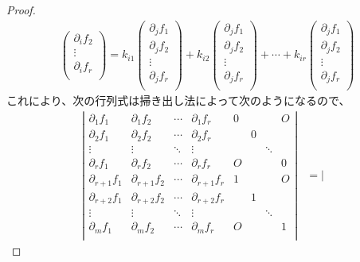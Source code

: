 \documentclass[dvipdfmx]{jsarticle}
\begin{document}
\begin{proof}
\begin{align*}
\begin{pmatrix}
  \partial_{i}f_{2} \\
   \vdots \\
  \partial_{i}f_{r} \\
\end{pmatrix} = k_{i1} \begin{pmatrix}
  \partial_{j}f_{1} \\
  \partial_{j}f_{2} \\
   \vdots \\
  \partial_{j}f_{r} \\
\end{pmatrix} + k_{i2} \begin{pmatrix}
  \partial_{j}f_{1} \\
  \partial_{j}f_{2} \\
   \vdots \\
  \partial_{j}f_{r} \\
\end{pmatrix} + \cdots + k_{ir} \begin{pmatrix}
  \partial_{j}f_{1} \\
  \partial_{j}f_{2} \\
   \vdots \\
  \partial_{j}f_{r} \\
\end{pmatrix}
\end{align*}
これにより、次の行列式は掃き出し法によって次のようになるので、
\begin{align*}
\left| \begin{matrix}
\partial_{1}f_{1} & \partial_{1}f_{2} & \cdots & \partial_{1}f_{r} & 0 & \  & \  & O \\
\partial_{2}f_{1} & \partial_{2}f_{2} & \cdots & \partial_{2}f_{r} & \  & 0 & \  & \  \\
 \vdots & \vdots & \ddots & \vdots & \  & \  & \ddots & \  \\
\partial_{r}f_{1} & \partial_{r}f_{2} & \cdots & \partial_{r}f_{r} & O & \  & \  & 0 \\
\partial_{r + 1}f_{1} & \partial_{r + 1}f_{2} & \cdots & \partial_{r + 1}f_{r} & 1 & \  & \  & O \\
\partial_{r + 2}f_{1} & \partial_{r + 2}f_{2} & \cdots & \partial_{r + 2}f_{r} & \  & 1 & \  & \  \\
 \vdots & \vdots & \ddots & \vdots & \  & \  & \ddots & \  \\
\partial_{m}f_{1} & \partial_{m}f_{2} & \cdots & \partial_{m}f_{r} & O & \  & \  & 1 \\
\end{matrix} \right| &= \left| \begin{matrix}

\end{matrix}
\end{align*}
\end{proof}
\end{document}
